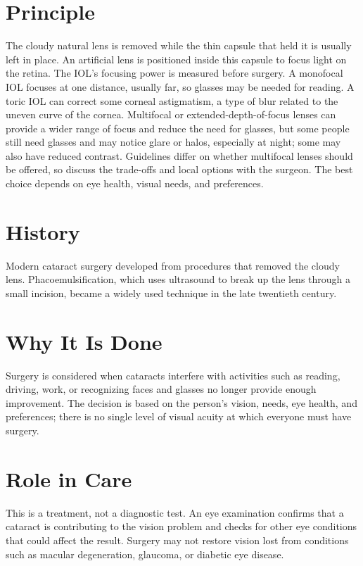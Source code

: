 \section*{Principle}
The cloudy natural lens is removed while the thin capsule that held it is usually left in place. An artificial lens is positioned inside this capsule to focus light on the retina. The IOL's focusing power is measured before surgery. A monofocal IOL focuses at one distance, usually far, so glasses may be needed for reading. A toric IOL can correct some corneal astigmatism, a type of blur related to the uneven curve of the cornea. Multifocal or extended-depth-of-focus lenses can provide a wider range of focus and reduce the need for glasses, but some people still need glasses and may notice glare or halos, especially at night; some may also have reduced contrast. Guidelines differ on whether multifocal lenses should be offered, so discuss the trade-offs and local options with the surgeon. The best choice depends on eye health, visual needs, and preferences.

\section*{History}
Modern cataract surgery developed from procedures that removed the cloudy lens. Phacoemulsification, which uses ultrasound to break up the lens through a small incision, became a widely used technique in the late twentieth century.

\section*{Why It Is Done}
Surgery is considered when cataracts interfere with activities such as reading, driving, work, or recognizing faces and glasses no longer provide enough improvement. The decision is based on the person's vision, needs, eye health, and preferences; there is no single level of visual acuity at which everyone must have surgery.

\section*{Role in Care}
This is a treatment, not a diagnostic test. An eye examination confirms that a cataract is contributing to the vision problem and checks for other eye conditions that could affect the result. Surgery may not restore vision lost from conditions such as macular degeneration, glaucoma, or diabetic eye disease.

